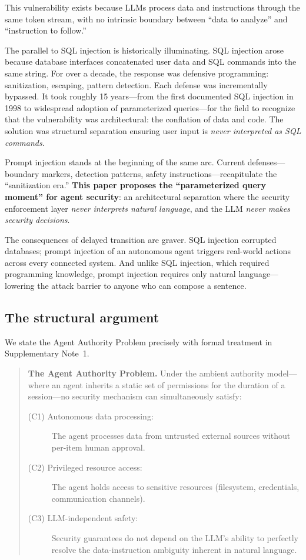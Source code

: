 \documentclass[pdflatex,sn-nature]{sn-jnl}%
\theoremstyle{thmstyleone}%
\theoremstyle{thmstyletwo}%
\theoremstyle{thmstylethree}%
\begin{document}
This vulnerability exists because LLMs process data and instructions through the same token stream, with no intrinsic boundary between ``data to analyze'' and ``instruction to follow.''

The parallel to SQL injection is historically illuminating. SQL injection arose because database interfaces concatenated user data and SQL commands into the same string. For over a decade, the response was defensive programming: sanitization, escaping, pattern detection. Each defense was incrementally bypassed. It took roughly 15 years---from the first documented SQL injection in 1998 to widespread adoption of parameterized queries---for the field to recognize that the vulnerability was architectural: the conflation of data and code. The solution was structural separation ensuring user input is \emph{never interpreted as SQL commands}.

Prompt injection stands at the beginning of the same arc. Current defenses---boundary markers, detection patterns, safety instructions---recapitulate the ``sanitization era.'' \textbf{This paper proposes the ``parameterized query moment'' for agent security}: an architectural separation where the security enforcement layer \emph{never interprets natural language}, and the LLM \emph{never makes security decisions}.

The consequences of delayed transition are graver. SQL injection corrupted databases; prompt injection of an autonomous agent triggers real-world actions across every connected system. And unlike SQL injection, which required programming knowledge, prompt injection requires only natural language---lowering the attack barrier to anyone who can compose a sentence.

\subsection{The structural argument}\label{subsec:structural}

We state the Agent Authority Problem precisely with formal treatment in Supplementary Note~1.

\begin{quote}
\textbf{The Agent Authority Problem.} Under the ambient authority model---where an agent inherits a static set of permissions for the duration of a session---no security mechanism can simultaneously satisfy:
\begin{description}
  \item[(C1) Autonomous data processing:] The agent processes data from untrusted external sources without per-item human approval.
  \item[(C2) Privileged resource access:] The agent holds access to sensitive resources (filesystem, credentials, communication channels).
  \item[(C3) LLM-independent safety:] Security guarantees do not depend on the LLM's ability to perfectly resolve the data-instruction ambiguity inherent in natural language.
\end{description}
\end{quote}
\end{document}
